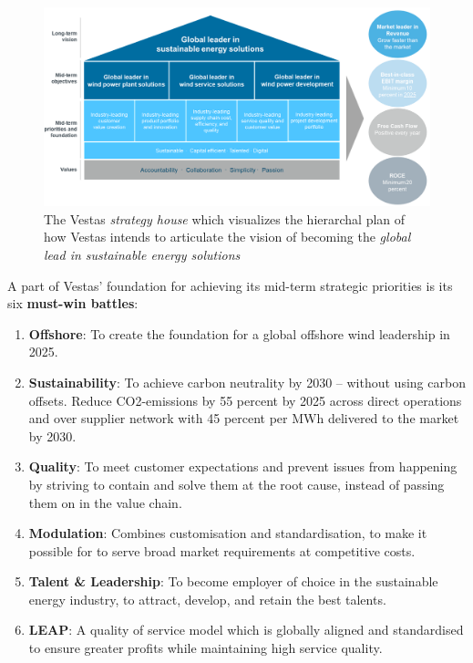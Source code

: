 \begin{figure}[ht]
	\centering
	\includegraphics[width=0.85\linewidth]{Graphics/vestasStrategyHouse.png}
	\caption{The Vestas \textit{strategy house} which visualizes the hierarchal plan of how Vestas intends to articulate the vision of becoming the \textit{global lead in sustainable energy solutions}}
	\label{fig:vestas_strategy_house}
\end{figure}

\noindent A part of Vestas' foundation for achieving its mid-term strategic priorities is its six \textbf{must-win battles}:
\begin{enumerate}
	\item \textbf{Offshore}: To create the foundation for a global offshore wind leadership in 2025.
	\item \textbf{Sustainability}: To achieve carbon neutrality by 2030 – without using carbon offsets. Reduce CO2-emissions by 55 percent by 2025 across direct operations and over supplier network with 45 percent per MWh delivered to the market by 2030.
	\item \textbf{Quality}: To meet customer expectations and prevent issues from happening by striving to contain and solve them at the root cause, instead of passing them on in the value chain.
	\item \textbf{Modulation}: Combines customisation and standardisation, to make it possible for to serve broad market requirements at competitive costs.
	\item \textbf{Talent \& Leadership}: To become employer of choice in the sustainable energy industry, to attract, develop, and retain the best talents.
	\item \textbf{LEAP}: A quality of service model which is globally aligned and standardised to ensure greater profits while maintaining high service quality.
\end{enumerate}

